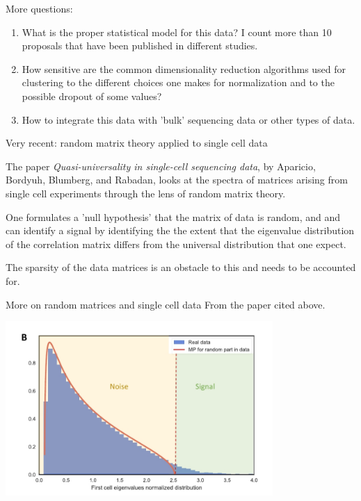 \documentclass{beamer}
\begin{document}
\begin{frame}
  More questions:
        \begin{enumerate}
        \item What is the proper statistical model for this data?  I count more than 10 proposals that have been published in different studies.
        \item How sensitive are the common dimensionality reduction algorithms used for clustering to the different choices one makes for normalization and to the possible dropout of some values?
        \item How to integrate this data with 'bulk' sequencing data or other types of data.
        \end{enumerate}
\end{frame}
\begin{frame}{Very recent: random matrix theory applied to single cell data}
\begin{block}{}
The paper \textit{Quasi-universality in single-cell sequencing data}, by Aparicio, Bordyuh, Blumberg, and Rabadan, looks
at the spectra of matrices arising from single cell experiments through the lens of random matrix theory.
\end{block}
\begin{block}{}
One formulates a 'null hypothesis' that the matrix of data is random, and and can identify a signal by identifying the the extent that the eigenvalue distribution of the correlation matrix differs from the universal distribution that one expect.
\end{block}
\begin{block}{}
The sparsity of the data matrices is an obstacle to this and needs to be accounted for.
\end{block}
\end{frame}
\begin{frame}{More on random matrices and single cell data}
From the paper cited above.
\begin{center}
\includegraphics[width=4in]{RMT2.png}
\end{center}
\end{frame}
\end{document}
